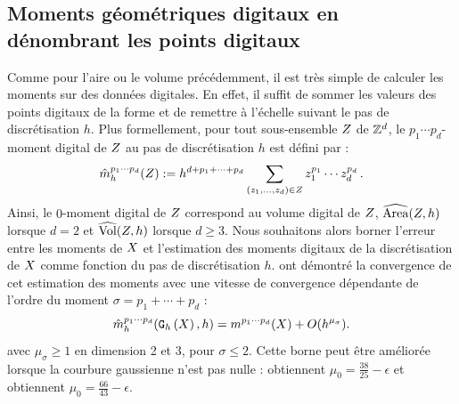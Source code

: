 \subsection{Moments géométriques digitaux en dénombrant les points digitaux}
\label{sec:MomentsByCounting}
%
Comme pour l'aire ou le volume précédemment, il est très simple de calculer les
moments sur des données digitales. En effet, il suffit de sommer les valeurs des
points digitaux de la forme et de remettre à l'échelle suivant le pas de
discrétisation $h$. Plus formellement, pour tout sous-ensemble $Z$ de
$\mathbb{Z}^d$, le $p_1 \cdots p_d$-moment digital de $Z$ au pas de
discrétisation $h$ est défini par :
%
\begin{equation} \label{eq:MomentsByCounting-def}
%
  \DMom{p_1 \cdots p_d}{h}(\DigShape) \EqDef h^{d + p_1 + \cdots + p_d} \sum_{(z_1,\ldots,z_d) \in \DigShape} z_1^{p_1} \cdots z_d^{p_d} \,.
%
\end{equation}
%
Ainsi, le $0$-moment digital de $Z$ correspond au volume digital de
$Z$, \cad $\widehat{\mathrm{Area}}(Z,h)$ lorsque $d = 2$ et $\widehat{\mathrm{Vol}}(Z,h)$
lorsque $d \geq 3$.
%
Nous souhaitons alors borner l'erreur entre les moments de $X$ et
l'estimation des moments digitaux de la discrétisation de $X$ comme
fonction du pas de discrétisation $h$.  ont
démontré la convergence de cet estimation des moments avec une vitesse de
convergence dépendante de l'ordre du moment $\sigma = p_1 + \cdots + p_d$ :
%
\begin{equation} \label{eq:MomentsByCounting-conv}
%
  \DMom{p_1 \cdots p_d}{h}(\DigF{\Shape}{h},h) = \Mom{p_1 \cdots p_d}(\Shape) + O(h^{\mu_{\sigma}}).
%
\end{equation}
%
avec $\mu_{\sigma} \ge 1$ en dimension 2 et 3, pour $\sigma \le 2$.
Cette borne peut être améliorée lorsque la courbure gaussienne n'est pas nulle :
 obtiennent $\mu_0=\frac{38}{25}-\epsilon$ et
 obtiennent $\mu_0 = \frac{66}{43}-\epsilon$.
%
